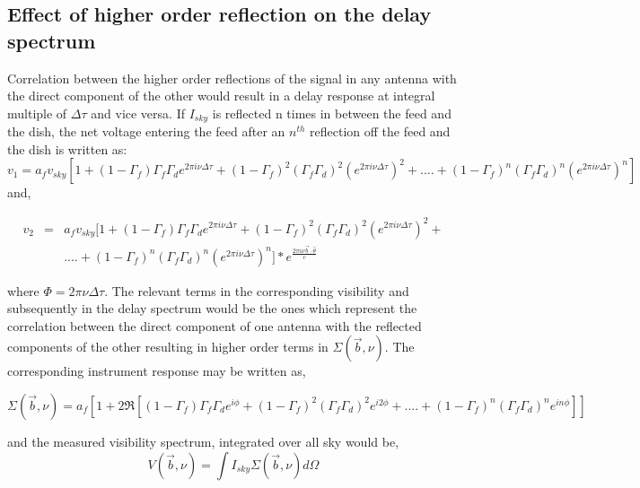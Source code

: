 \documentclass[12pt,preprint]{aastex}
\newcommand{\volt}{{v}}
\newcommand{\vis}{{V}}
\newcommand{\thhat}{{\hat\theta}}
\newcommand{\fngexp}{{e^{\frac{2\pi i\nu\vec{b}\cdot\thhat}{c}}}}
\newcommand{\dfngexp}{{e^{2\pi i\nu \Delta \tau}}}
\begin{document}
\subsection{Effect of higher order reflection on the delay spectrum} 
Correlation between the higher order reflections of the signal in any antenna with the direct component of the other would result in a delay response at integral multiple of $\Delta \tau$ and vice versa. 
If $I_{sky}$ is reflected n times in between the feed and the dish, the net voltage entering the feed after an
$n^{th}$ reflection off the feed and the dish is written as:
\begin{equation}
\volt_{1} =  a_{f} \volt_{sky}[1+ (1-\Gamma_{f})\Gamma_{f}\Gamma_{d} \dfngexp + (1-\Gamma_{f})^{2} (\Gamma_{f}\Gamma_{d})^2  (\dfngexp)^{2}+ ....+ (1-\Gamma_{f})^{n}(\Gamma_{f}\Gamma_{d})^{n} (\dfngexp)^{n}]
\end{equation}
and, 

\begin{eqnarray}
\volt_{2} & = &  a_{f} \volt_{sky}[1+ (1-\Gamma_{f})\Gamma_{f}\Gamma_{d} \dfngexp + (1-\Gamma_{f})^{2} (\Gamma_{f}\Gamma_{d})^2  (\dfngexp)^{2}+ \nonumber \\
&& ....+ (1-\Gamma_{f})^{n}(\Gamma_{f}\Gamma_{d})^{n} (\dfngexp)^{n}] \ast \fngexp 
\end{eqnarray}

where $\Phi = 2\pi\nu\Delta \tau$. The relevant terms in the corresponding visibility and subsequently in the delay spectrum would be the ones which represent the correlation between the direct component of one antenna with the reflected components of the other resulting in higher order terms  in $\Sigma(\vec b, \nu)$. The corresponding instrument response may be written as, 

\begin{equation}
\Sigma(\vec b, \nu) = a_{f} \left [ 1+ 2 \Re \left [(1-\Gamma_{f}) \Gamma_{f}\Gamma_{d} e^{i\phi}+ (1-\Gamma_{f})^{2}(\Gamma_{f}\Gamma_{d})^2e^{i2\phi}+ ....+(1-\Gamma_{f})^{n} (\Gamma_{f}\Gamma_{d})^{n}e^{in\phi} \right ]\right ]
\end{equation}

and the measured visibility spectrum, integrated over all sky would be, 
\begin{equation}\label{eqn:series1}
\vis(\vec b, \nu)  = \int I_{sky}\Sigma(\vec b, \nu) d\Omega
\end{equation}
\end{document}
